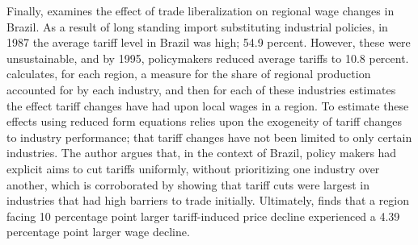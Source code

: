Finally, \citet{kovak}  examines 
the effect of trade liberalization on regional wage changes in Brazil. As a result of long standing
import substituting industrial policies, in 1987 the average tariff level in Brazil was high; 
54.9 percent. However, these were unsustainable, and by 1995, policymakers reduced average tariffs 
to 10.8 percent. \citeauthor{kovak} calculates, for each region, a measure for the share of regional production 
accounted for by each industry, and then for each of these industries estimates the effect tariff 
changes have had upon local wages in a region. 
To estimate these effects using reduced form equations relies upon the exogeneity of tariff changes to 
industry performance; that tariff changes have not been limited to only certain industries. 
The author argues that, in the context of Brazil, policy makers had explicit aims to cut tariffs 
uniformly, without prioritizing one industry over another, which is corroborated by showing that 
tariff cuts were largest in industries that had high barriers to trade initially.
Ultimately, \citeauthor{kovak} finds that a region facing 10 percentage point larger tariff-induced 
price decline experienced a 4.39 percentage point larger wage decline.